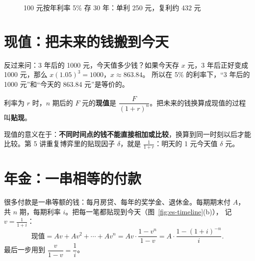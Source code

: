 \begin{figure}[!htbp]
\centering
{}
\caption{100 元按年利率 5\% 存 30 年：单利 250 元，复利约 432 元}
\label{fig:es-compound}
\end{figure}

\section{现值：把未来的钱搬到今天}

反过来问：3 年后的 1000 元，今天值多少钱？如果今天存 $x$ 元，3 年后正好变成 1000 元，那么 $x(1.05)^3=1000$，$x\approx863.84$。
所以在 5\% 的利率下，“3 年后的 1000 元”和“今天的 863.84 元”是等价的。

\begin{definition}[现值]
利率为 $r$ 时，$n$ 期后的 $F$ 元的\textbf{现值}是 $\dfrac{F}{(1+r)^n}$。把未来的钱换算成现值的过程叫\textbf{贴现}。
\end{definition}

现值的意义在于：\textbf{不同时间点的钱不能直接相加或比较}，换算到同一时刻以后才能比较。第 5 讲重复博弈里的贴现因子 $\delta$，就是 $\frac1{1+r}$：明天的 1 元今天值 $\delta$ 元。

\section{年金：一串相等的付款}

很多付款是一串等额的钱：每月房贷、每年的奖学金、退休金。每期期末付 $A$，共 $n$ 期，每期利率 $i$。把每一笔都贴现到今天（图~\ref{fig:es-timeline}(b)），
记 $v=\frac1{1+i}$：
\[
  \text{现值}=Av+Av^2+\cdots+Av^n=Av\cdot\frac{1-v^n}{1-v}=A\cdot\frac{1-(1+i)^{-n}}{i}.
\]
最后一步用到 $\dfrac{v}{1-v}=\dfrac1i$。

